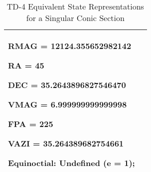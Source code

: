 \begin{table}[htbp!]
\begin{tabular}{|p{1.0 in} |p{5.0 in} |}
\begin{compactenum}
\begin{compactenum}
                  \item RMAG = 12124.355652982142
                  \item RA = 45
                  \item DEC = 35.2643896827546470
                  \item VMAG = 6.999999999999998
                  \item FPA = 225
                  \item VAZI = 35.264389682754661
              \end{compactenum}
              \item Equinoctial: Undefined (e = 1);
          \end{compactenum}\\

         \hline
\end{tabular}
   \label{Table:TD-4}
   \caption{TD-4 Equivalent State Representations for a Singular Conic Section}
\end{table} 